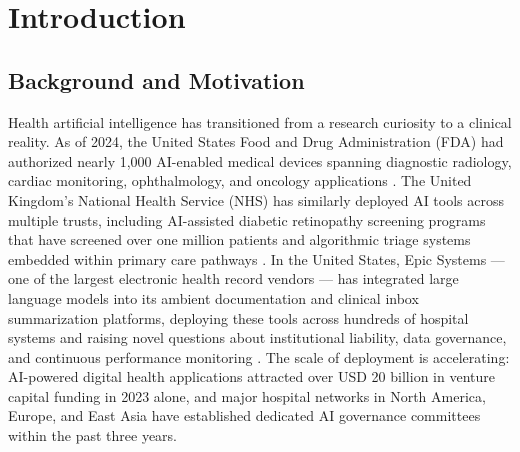 
\section{Introduction}
\label{sec:introduction}


\subsection{Background and Motivation}
\label{sec:background}

Health artificial intelligence has transitioned from a research curiosity to a clinical reality. As of 2024, the United States Food and Drug Administration (FDA) had authorized nearly 1,000 AI-enabled medical devices spanning diagnostic radiology, cardiac monitoring, ophthalmology, and oncology applications \citep{warraich2024fda}. The United Kingdom's National Health Service (NHS) has similarly deployed AI tools across multiple trusts, including AI-assisted diabetic retinopathy screening programs that have screened over one million patients and algorithmic triage systems embedded within primary care pathways \citep{nhs2024ai,price2024nhs}. In the United States, Epic Systems — one of the largest electronic health record vendors — has integrated large language models into its ambient documentation and clinical inbox summarization platforms, deploying these tools across hundreds of hospital systems and raising novel questions about institutional liability, data governance, and continuous performance monitoring \citep{epic2024llm,keri2026simulated}. The scale of deployment is accelerating: AI-powered digital health applications attracted over USD 20 billion in venture capital funding in 2023 alone, and major hospital networks in North America, Europe, and East Asia have established dedicated AI governance committees within the past three years.

